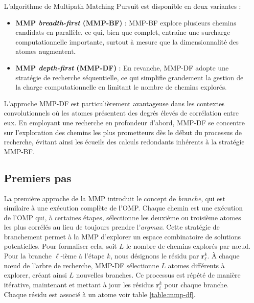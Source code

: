 \documentclass[9pt,a4paper,twoside]{rho}
\begin{document}
\begin{rhoenv}[frametitle=La stratégie \textit{depth-first}]
    L'algorithme de Multipath Matching Pursuit est disponible en deux variantes :
    \begin{itemize}
        \item \textbf{MMP \textit{breadth-first} (MMP-BF)} : MMP-BF explore plusieurs chemins candidats en parallèle, ce qui, bien que complet, entraîne une surcharge computationnelle importante, surtout à mesure que la dimensionnalité des atomes augmentent.
        \item \textbf{MMP \textit{depth-first}  (MMP-DF)} : En revanche, MMP-DF adopte une stratégie de recherche séquentielle, ce qui simplifie grandement la gestion de la charge computationnelle en limitant le nombre de chemins explorés.
    \end{itemize}
\end{rhoenv}


L'approche MMP-DF est particulièrement avantageuse dans les contextes convolutionnels où les atomes présentent des degrés élevés de corrélation entre eux. En employant une recherche en profondeur d'abord, MMP-DF se concentre sur l'exploration des chemins les plus prometteurs dès le début du processus de recherche, évitant ainsi les écueils des calculs redondants inhérents à la stratégie MMP-BF.

\subsection{Premiers pas}
La première approche de la MMP introduit le concept de \emph{branche}, qui est similaire à une exécution complète de l'OMP. 
Chaque chemin est une exécution de l'OMP qui, à certaines étapes, sélectionne les deuxième ou troisième atomes les plus corrélés au lieu de toujours prendre l'\textit{argmax}. 
Cette stratégie de branchement permet à la MMP d'explorer un espace combinatoire de solutions potentielles. 
Pour formaliser cela, soit $L$ le nombre de chemins explorés par nœud. 
Pour la branche $\ell$-ième à l'étape $k$, nous désignons le résidu par $\mathbf{r}_{\ell}^k$. À chaque nœud de l'arbre de recherche, MMP-DF sélectionne $L$ atomes différents à explorer, créant ainsi $L$ nouvelles branches. Ce processus est répété de manière itérative, maintenant et mettant à jour les résidus $\mathbf{r}_i^k$ pour chaque branche. Chaque résidu est associé à un atome voir table \ref{table:mmp-df}.
\renewcommand{\arraystretch}{1.6} %
\end{document}
